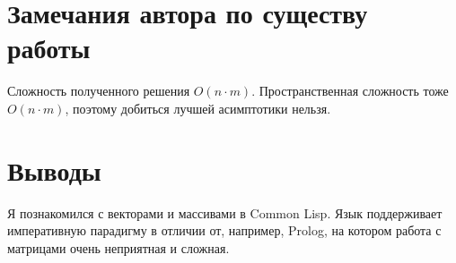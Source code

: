 \documentclass[12pt]{article}
\begin{document}
\section{Замечания автора по существу работы}

Сложность полученного решения $O(n \cdot m)$. Пространственная сложность тоже $O(n \cdot m)$, поэтому добиться лучшей асимптотики нельзя.

\section{Выводы}
Я познакомился с векторами и массивами в Common Lisp. Язык поддерживает императивную парадигму в отличии от, например, Prolog, на котором работа с матрицами очень неприятная и сложная.
\end{document}
